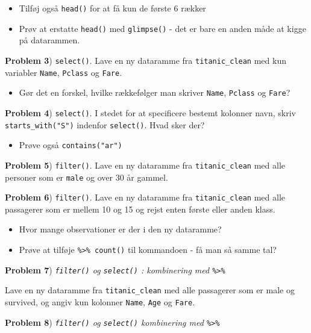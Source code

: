 \documentclass[
]{book}
\providecommand{\tightlist}{%
  \setlength{\itemsep}{0pt}\setlength{\parskip}{0pt}}
\begin{document}
\begin{itemize}
\tightlist
\item
  Tilføj også \texttt{head()} for at få kun de første 6 rækker
\item
  Prøv at erstatte \texttt{head()} med \texttt{glimpse()} - det er bare en anden måde at kigge på datarammen.
\end{itemize}

\textbf{Problem 3}) \texttt{select()}. Lave en ny dataramme fra \texttt{titanic\_clean} med kun variabler \texttt{Name}, \texttt{Pclass} og \texttt{Fare}.

\begin{itemize}
\tightlist
\item
  Gør det en forskel, hvilke rækkefølger man skriver \texttt{Name}, \texttt{Pclass} og \texttt{Fare}?
\end{itemize}

\textbf{Problem 4}) \texttt{select()}. I stedet for at specificere bestemt kolonner navn, skriv \texttt{starts\_with("S")} indenfor \texttt{select()}. Hvad sker der?

\begin{itemize}
\tightlist
\item
  Prøve også \texttt{contains("ar")}
\end{itemize}

\textbf{Problem 5}) \texttt{filter()}. Lave en ny dataramme fra \texttt{titanic\_clean} med alle personer som er \texttt{male} og over 30 år gammel.

\textbf{Problem 6}) \texttt{filter()}. Lave en ny dataramme fra \texttt{titanic\_clean} med alle passagerer som er mellem 10 og 15 og rejst enten første eller anden klass.

\begin{itemize}
\tightlist
\item
  Hvor mange observationer er der i den ny dataramme?
\item
  Prøve at tilføje \texttt{\%\textgreater{}\%\ count()} til kommandoen - få man så samme tal?
\end{itemize}

\textbf{Problem 7}) \emph{\texttt{filter()} og \texttt{select()} : kombinering med \texttt{\%\textgreater{}\%}}

Lave en ny dataramme fra \texttt{titanic\_clean} med alle passagerer som er male og survived, og angiv kun kolonner \texttt{Name}, \texttt{Age} og \texttt{Fare}.

\textbf{Problem 8}) \emph{\texttt{filter()} og \texttt{select()} kombinering med \texttt{\%\textgreater{}\%}}
\end{document}
